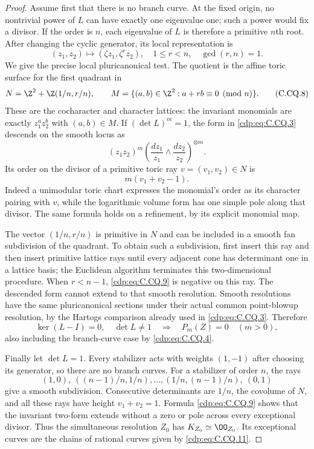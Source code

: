 \begin{proof}
Assume first that there is no branch curve. At the
fixed origin, no nontrivial power of $L$ can have
exactly one eigenvalue one; such a power would fix
a divisor. If the order is $n$, each eigenvalue
of $L$ is therefore a primitive $n$th root.
After changing the cyclic generator, its local
representation is
\[
             (z_1,z_2)\longmapsto
                     (\zeta z_1,\zeta^r z_2),
       \quad 1\le r<n,\quad \gcd(r,n)=1 .
                                                               \tag{C.CQ.7}\label{cdp:eq:C.CQ.7}
\]
We give the precise local pluricanonical test. The
quotient is the affine toric surface for the first
quadrant in
\[
 N=\Z^2+\Z(1/n,r/n),\qquad
 M=\{(a,b)\in\Z^2:a+rb\equiv0\pmod n\}.
                                                               \tag{C.CQ.8}\label{cdp:eq:C.CQ.8}
\]
These are the cocharacter and character lattices:
the invariant monomials are exactly
$z_1^az_2^b$ with $(a,b)\in M$. If
$(\det L)^m=1$, the form in \eqref{cdp:eq:C.CQ.3} descends on
the smooth locus as
\[
 (z_1z_2)^m
       \left(\frac{dz_1}{z_1}\wedge
             \frac{dz_2}{z_2}\right)^{\otimes m}.
\]
Its order on the divisor of a primitive toric ray
$v=(v_1,v_2)\in N$ is
\[
                       m(v_1+v_2-1).
                                                               \tag{C.CQ.9}\label{cdp:eq:C.CQ.9}
\]
Indeed a unimodular toric chart expresses the
monomial's order as its character pairing with $v$,
while the logarithmic volume form has one simple
pole along that divisor. The same formula holds
on a refinement, by its explicit monomial map.

The vector $(1/n,r/n)$ is primitive in $N$ and
can be included in a smooth fan subdivision of
the quadrant. To obtain such a subdivision, first
insert this ray and then insert primitive lattice
rays until every adjacent cone has determinant
one in a lattice basis; the Euclidean algorithm
terminates this two-dimensional procedure.
When $r<n-1$, \eqref{cdp:eq:C.CQ.9} is negative on this ray.
The descended form cannot extend to that smooth
resolution. Smooth resolutions have the same
pluricanonical sections under their actual common
point-blowup resolution, by the Hartogs comparison
already used in \eqref{cdp:eq:C.CQ.3}. Therefore
\[
 \ker(L-I)=0,\quad \det L\ne1
      \quad\Longrightarrow\quad P_m(Z)=0\quad(m>0),
                                                               \tag{C.CQ.10}\label{cdp:eq:C.CQ.10}
\]
also including the branch-curve case by \eqref{cdp:eq:C.CQ.4}.

Finally let $\det L=1$. Every stabilizer acts with
weights $(1,-1)$ after choosing its generator, so
there are no branch curves. For a stabilizer of
order $n$, the rays
\[
 (1,0),\ ((n-1)/n,1/n),\ldots,
                 (1/n,(n-1)/n),\ (0,1)
                                                               \tag{C.CQ.11}\label{cdp:eq:C.CQ.11}
\]
give a smooth subdivision. Consecutive determinants
are $1/n$, the covolume of $N$, and all these rays
have height $v_1+v_2=1$. Formula \eqref{cdp:eq:C.CQ.9} shows
that the invariant two-form extends without a
zero or pole across every exceptional divisor.
Thus the simultaneous resolution $Z_0$ has
$K_{Z_0}\simeq\OO_{Z_0}$. Its exceptional curves
are the chains of rational curves given by
\eqref{cdp:eq:C.CQ.11}.


\end{proof}
